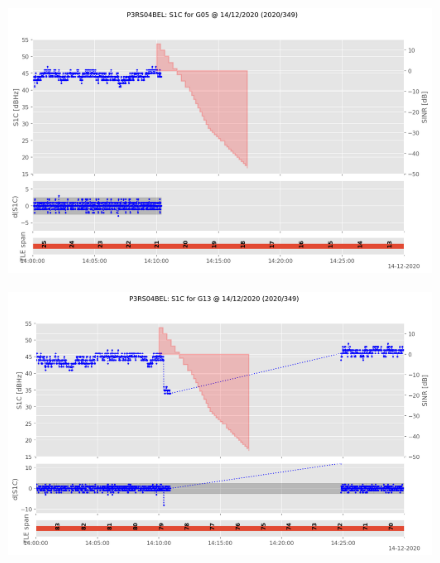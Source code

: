 \begin{enumerate}
\begin{figure}[H]%
\centering%
\includegraphics[width=0.95\linewidth]{png/P3RS04BEL_R_20203490000_01D_00U_MO_G-S1C-G05.png}%
\end{figure}

%


\begin{figure}[H]%
\centering%
\includegraphics[width=0.95\linewidth]{png/P3RS04BEL_R_20203490000_01D_00U_MO_G-S1C-G13.png}%
\end{figure}


\end{enumerate}
